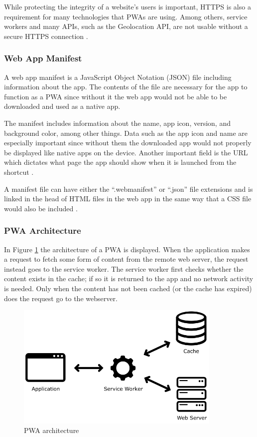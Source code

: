 \documentclass[a4paper,12pt]{article}
\begin{document}
While protecting the integrity of a website’s users is important, HTTPS is also a requirement for many technologies that PWAs are using. Among others, service workers and many APIs, such as the Geolocation API, are not usable without a secure HTTPS connection \cite{why_https_matters}.

\subsubsection{Web App Manifest}
\label{Theory_PWA_webManifest}
A web app manifest is a JavaScript Object Notation (JSON) file including information about the app. The contents of the file are necessary for the app to function as a PWA since without it the web app would not be able to be downloaded and used as a native app.

The manifest includes information about the name, app icon, version, and background color, among other things. Data such as the app icon and name are especially important since without them the downloaded app would not properly be displayed like native apps on the device. Another important field is the URL which dictates what page the app should show when it is launched from the shortcut \cite{mozilla_webmanifest}.

A manifest file can have either the “.webmanifest” or “.json” file extensions and is linked in the head of HTML files in the web app in the same way that a CSS file would also be included \cite{mozilla_webmanifest}.


\subsubsection{PWA Architecture}
\label{Theory_PWA_architecture}
In Figure \ref{fig:pwaapp} the architecture of a PWA is displayed. When the application makes a request to fetch some form of content from the remote web server, the request instead goes to the service worker. The service worker first checks whether the content exists in the cache; if so it is returned to the app and no network activity is needed. Only when the content has not been cached (or the cache has expired) does the request go to the webserver.

\begin{figure}[h]%
	\centering
	\includegraphics[height=6cm]{img/Other/struct_pwa.png}
	\caption{PWA architecture}%
	\label{fig:pwaapp}%
\end{figure}
\end{document}
